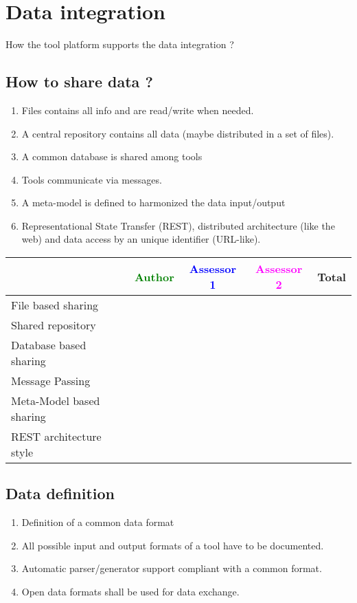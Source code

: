 \section{Data integration}
How the tool platform supports the data integration ?

\subsection{How to share data ?}
\begin{enumerate}
\item Files contains all info and are read/write when needed.
\item A central repository contains all data (maybe distributed in a
  set of files).
\item A common database is shared among tools
\item Tools communicate via messages.
\item A meta-model is defined to harmonized the data input/output
\item Representational State Transfer (REST), distributed architecture (like the web) and data access by an
  unique identifier (URL-like).
\end{enumerate}
\begin{tabular}{|l | c | c | c | c|} \hline
  & \textcolor{green}{Author} & \textcolor{blue}{Assessor 1} &  \textcolor{magenta}{Assessor 2} & Total \\
  \hline File based sharing &
  &                 &                  &\\
  \hline Shared repository &
  &                 &                  &\\
  \hline Database based sharing&
  &                 &                  &\\
  \hline Message Passing&
  &                 &                  &\\
  \hline Meta-Model based sharing &
  &                 &                  &\\
  \hline REST architecture style &
  &                 &                  &\\
  \hline
\end{tabular}


\subsection{Data definition}
\begin{enumerate}
\item Definition of a common data format
\item All possible input and output formats of a tool have to be
  documented.
\item Automatic parser/generator support compliant with a common format.
\item Open data formats shall be used for data exchange.
 
\end{enumerate}

